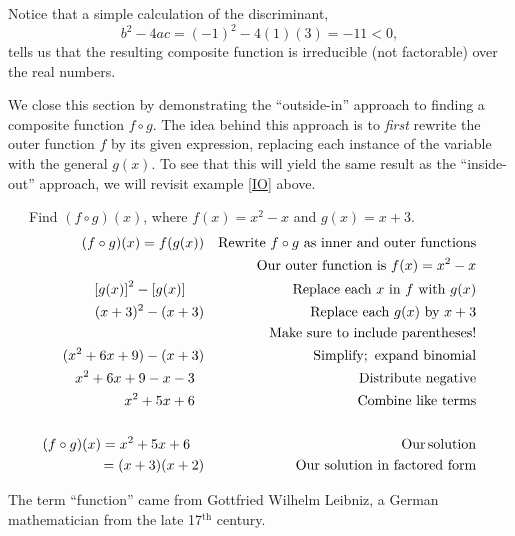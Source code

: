 Notice that a simple calculation of the discriminant, $$b^2-4ac=(-1)^2-4(1)(3)=-11<0,$$ tells us that the resulting composite function is irreducible (not factorable) over the real numbers.\pp

We close this section by demonstrating the ``outside-in'' approach to finding a composite function $f\circ g$.  The idea behind this approach is to \textit{first} rewrite the outer function $f$ by its given expression, replacing each instance of the variable with the general $g(x)$.  To see that this will yield the same result as the ``inside-out'' approach, we will revisit example \ref{IO} above.

\begin{example}~~~Find $(f \circ g) (x)$, where $f (x) = x^2 - x$ and $g (x) = x + 3$.
  \begin{eqnarray*}
    (f \circ g) (x)=f (g (x)) &  & \text{Rewrite~} f\circ g \text{~as~inner~and~outer~functions}\\
	    &  & \text{Our~outer~function~is~} f(x) = x^2 - x\\
    \left[g(x)\right]^2-\left[g(x)\right]~~~~ &  & \text{Replace~each~} x \text{~in~} f \text{~with~} g(x)\\
		 (x + 3)^2 - (x + 3) &  & \text{Replace~each~} g(x) \text{~by~} x+3\\
		& & \text{Make~sure~to~include~parentheses!}\\
    (x^2 + 6 x + 9) - (x + 3)  &  & \operatorname{Simplify;~expand~binomial}\\
    x^2 + 6 x + 9 - x - 3~~ &  & \operatorname{Distribute~negative}\\
    x^2 + 5 x + 6~~ &  & \operatorname{Combine~like~terms}\\
    & & \\
		(f \circ g) (x)=x^2 + 5 x + 6~~~ &  & \operatorname{Our} \operatorname{solution}\\
		=(x+3)(x+2) & & \text{Our~solution~in~factored~form}
  \end{eqnarray*}
\end{example}


{} The term ``function'' came from Gottfried Wilhelm
Leibniz, a German mathematician from the late 17$^{\text{th}}$ century.

	
	
	
	
